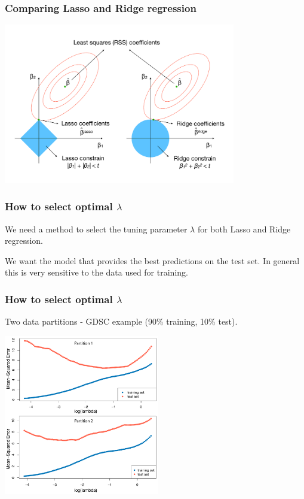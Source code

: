 \documentclass[notes]{beamer}          %
\begin{document}
\begin{frame}
\frametitle{Comparing Lasso and Ridge regression}

\begin{center}
\includegraphics[height=7cm]{../figures/week_2_linear_models/Comparison_lasso_ridge.pdf}
\end{center}

\end{frame}


\begin{frame}
\frametitle{How to select optimal $\lambda$}

We need a method to select the tuning parameter $\lambda$ for both Lasso and Ridge regression.

\vspace{5mm} 

We want the model that provides the best predictions on the test set. In general this is very sensitive to the data used for training.
\end{frame}


\begin{frame}
\frametitle{How to select optimal $\lambda$}

Two data partitions - GDSC example (90\% training, 10\% test).

\begin{center}
\includegraphics[height=7cm]{../figures/week_2_linear_models/Lasso_MSE_train_test.pdf}
\end{center}
\end{frame}
\end{document}

